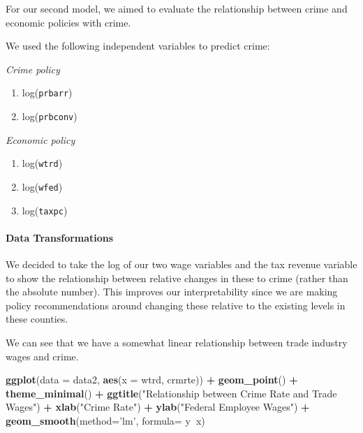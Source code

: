 \documentclass[]{article}
\newenvironment{Shaded}{\begin{snugshade}}{\end{snugshade}}
\newcommand{\DataTypeTok}[1]{\textcolor[rgb]{0.13,0.29,0.53}{#1}}
\newcommand{\KeywordTok}[1]{\textcolor[rgb]{0.13,0.29,0.53}{\textbf{#1}}}
\newcommand{\NormalTok}[1]{#1}
\newcommand{\OperatorTok}[1]{\textcolor[rgb]{0.81,0.36,0.00}{\textbf{#1}}}
\newcommand{\StringTok}[1]{\textcolor[rgb]{0.31,0.60,0.02}{#1}}
\providecommand{\tightlist}{%
  \setlength{\itemsep}{0pt}\setlength{\parskip}{0pt}}
\let\oldparagraph\paragraph
\renewcommand{\paragraph}[1]{\oldparagraph{#1}\mbox{}}
\begin{document}
For our second model, we aimed to evaluate the relationship between
crime and economic policies with crime.

We used the following independent variables to predict crime:

\emph{Crime policy}

\begin{enumerate}
\def\labelenumi{(\arabic{enumi})}
\tightlist
\item
  log(\texttt{prbarr})
\item
  log(\texttt{prbconv})
\end{enumerate}

\emph{Economic policy}

\begin{enumerate}
\def\labelenumi{(\arabic{enumi})}
\setcounter{enumi}{2}
\item
  log(\texttt{wtrd})
\item
  log(\texttt{wfed})
\item
  log(\texttt{taxpc})
\end{enumerate}

\hypertarget{data-transformations-1}{%
\paragraph{Data Transformations}\label{data-transformations-1}}

We decided to take the log of our two wage variables and the tax revenue
variable to show the relationship between relative changes in these to
crime (rather than the absolute number). This improves our
interpretability since we are making policy recommendations around
changing these relative to the existing levels in these counties.

We can see that we have a somewhat linear relationship between trade
industry wages and crime.

\begin{Shaded}
\begin{Highlighting}[]
\KeywordTok{ggplot}\NormalTok{(}\DataTypeTok{data =}\NormalTok{ data2, }\KeywordTok{aes}\NormalTok{(}\DataTypeTok{x =}\NormalTok{ wtrd, crmrte)) }\OperatorTok{+}
\StringTok{  }\KeywordTok{geom_point}\NormalTok{() }\OperatorTok{+}
\StringTok{  }\KeywordTok{theme_minimal}\NormalTok{() }\OperatorTok{+}
\StringTok{  }\KeywordTok{ggtitle}\NormalTok{(}\StringTok{"Relationship between Crime Rate and Trade Wages"}\NormalTok{) }\OperatorTok{+}\StringTok{ }
\StringTok{  }\KeywordTok{xlab}\NormalTok{(}\StringTok{"Crime Rate"}\NormalTok{) }\OperatorTok{+}\StringTok{ }\KeywordTok{ylab}\NormalTok{(}\StringTok{"Federal Employee Wages"}\NormalTok{) }\OperatorTok{+}
\StringTok{  }\KeywordTok{geom_smooth}\NormalTok{(}\DataTypeTok{method=}\StringTok{'lm'}\NormalTok{, }\DataTypeTok{formula=}\NormalTok{ y}\OperatorTok{~}\NormalTok{x)}
\end{Highlighting}
\end{Shaded}
\end{document}

